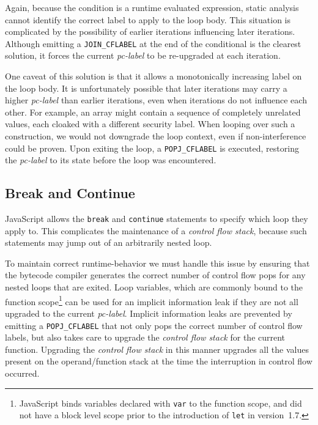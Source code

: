 \documentclass{llncs}
\begin{document}
Again, because the condition is a runtime evaluated expression, static analysis cannot identify the correct label to apply to the loop body.
This situation is complicated by the possibility of earlier iterations influencing later iterations.
Although emitting a \texttt{JOIN\_CFLABEL} at the end of the conditional is the clearest solution, it forces the current \textit{pc-label} to be re-upgraded at each iteration.

One caveat of this solution is that it allows a monotonically increasing label on the loop body.
It is unfortunately possible that later iterations may carry a higher \textit{pc-label} than earlier iterations, even when iterations do not influence each other.
For example, an array might contain a sequence of completely unrelated values, each cloaked with a different security label.
When looping over such a construction, we would not downgrade the loop context, even if non-interference could be proven.
Upon exiting the loop, a \texttt{POPJ\_CFLABEL} is executed, restoring the \textit{pc-label} to its state before the loop was encountered.

\subsection{Break and Continue}
\label{sec:break-and-continue}
JavaScript allows the \texttt{break} and \texttt{continue} statements to specify which loop they apply to.
This complicates the maintenance of a \textit{control flow stack}, because such statements may jump out of an arbitrarily nested loop.

To maintain correct runtime-behavior we must handle this issue by ensuring that the bytecode compiler generates the correct number of control flow pops for any nested loops that are exited.
Loop variables, which are commonly bound to the function scope\footnote{JavaScript binds variables declared with \texttt{var} to the function scope, and did not have a block level scope prior to the introduction of \texttt{let} in version~1.7.} can be used for an implicit information leak if they are not all upgraded to the current \textit{pc-label}.
Implicit information leaks are prevented by emitting a \texttt{POPJ\_CFLABEL} that not only pops the correct number of control flow labels, but also takes care to upgrade the \textit{control flow stack} for the current function.
Upgrading the \textit{control flow stack} in this manner upgrades all the values present on the operand/function stack at the time the interruption in control flow occurred.
\end{document}
